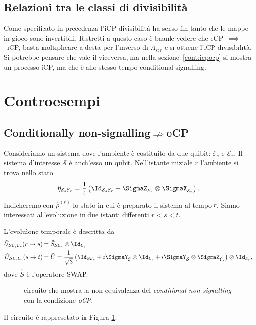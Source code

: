 \documentclass[a4]{article}
\begin{document}
\subsection{Relazioni tra le classi di divisibilità}
Come specificato in precedenza l'iCP divisibilità ha senso fin tanto che le mappe in gioco
sono invertibili. Ristretti a questo caso è baanle vedere che oCP~\(\implies\)~iCP, basta 
moltiplicare a desta per l'inverso di \(\Lambda_{s\colon r}\) e si ottiene l'iCP divisibilità.
Si potrebbe pensare che vale il viceversa, ma nella sezione~\ref{cont:icpocp} si mostra
un processo iCP, ma che è allo stesso tempo conditional signalling.






\section{Controesempi}
\subsection[Cond. non-signalling does not imply oCP]
           {Conditionally non-signalling\(\centernot\implies\)oCP} \label{cont:cnsocp}
Consideriamo un sistema dove l'ambiente è costituito da due quibit: \(\mathcal{E}_s\) e
\(\mathcal{E}_r\). Il sistema d'interesse \(\mathcal{S}\) è anch'esso un qubit.
Nell'istante iniziale \(r\) l'ambiente si trova nello stato
\[\hat{\eta}_{\mathcal{E}_s\mathcal{E}_r} =
  \frac{1}{4}\left(\Id_{\mathcal{E}_s\mathcal{E}_r} +
                    \SigmaZ_{\mathcal{E}_s} \otimes \SigmaX_{\mathcal{E}_r}
             \right). \]
Indicheremo con \(\hat{\rho}^{(r)}\) lo stato in cui è preparato il sistema al tempo \(r\).
Siamo interessati all'evoluzione in due istanti differenti \(r<s<t\).

L'evoluìone temporale è descritta da
\begin{align*}
	\hat{U}_{\mathcal{S}\mathcal{E}_s\mathcal{E}_r}(r \to s) &= 
	  \hat{S}_{\mathcal{S}\mathcal{E}_r} \otimes \Id_{\mathcal{E}_s} \\
	\hat{U}_{\mathcal{S}\mathcal{E}_s\mathcal{E}_r}(s \to t) &=
	  \hat{U} = \frac{1}{\sqrt{3}}\left(\Id_{\mathcal{S}\mathcal{E}_s} +
	    	                            i \SigmaY_{\mathcal{S}} \otimes \Id_{\mathcal{E}_s} +
	    	                            i \SigmaY_{\mathcal{S}} \otimes \SigmaZ_{\mathcal{E}_s}
	    	                      \right) \otimes \Id_{\mathcal{E}_r},    	    	                              
\end{align*}
dove \(\hat{S}\) è l'operatore SWAP.
\begin{figure}
	\centering
	
	\caption{circuito che mostra la non equivalenza del \emph{conditional non-signalling}
		con la condizione \emph{oCP}.}
	\label{fig:cnsNocp}
\end{figure}
Il circuito è rappresetato in Figura \ref{fig:cnsNocp}.
\end{document}
